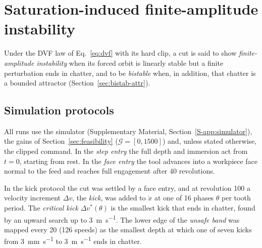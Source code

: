 \section{Saturation-induced finite-amplitude instability}\label{sec:bistability}

Under the DVF law of Eq.~\eqref{eq:dvf} with its hard clip, a cut is said to show \emph{finite-amplitude instability} when its forced orbit is linearly stable but a finite perturbation ends in chatter, and to be \emph{bistable} when, in addition, that chatter is a bounded attractor (Section~\ref{sec:bistab-attr}).

\subsection{Simulation protocols}\label{sec:bistab-prot}

All runs use the simulator (Supplementary Material, Section~\ref{S-app:simulator}), the gains of Section~\ref{sec:feasibility} ($\mathcal G=[0,1500]$) and, unless stated otherwise, the clipped command. In the \emph{step entry} the full depth and immersion act from $t=0$, starting from rest. In the \emph{face entry} the tool advances into a workpiece face normal to the feed and reaches full engagement after 40 revolutions.

In the kick protocol the cut was settled by a face entry, and at revolution 100 a velocity increment $\Delta v$, the \emph{kick}, was added to $\dot x$ at one of 16 phases $\theta$ per tooth period. The \emph{critical kick} $\Delta v^*(\theta)$ is the smallest kick that ends in chatter, found by an upward search up to \SI{3}{\metre\per\second}. The lower edge of the \emph{unsafe band} \citep{dombovari2015bistable,dombovari2019experimental} was mapped every \SI{20}{\rpm} (126 speeds) as the smallest depth at which one of seven kicks from \SI{3}{\milli\metre\per\second} to \SI{3}{\metre\per\second} ends in chatter.

